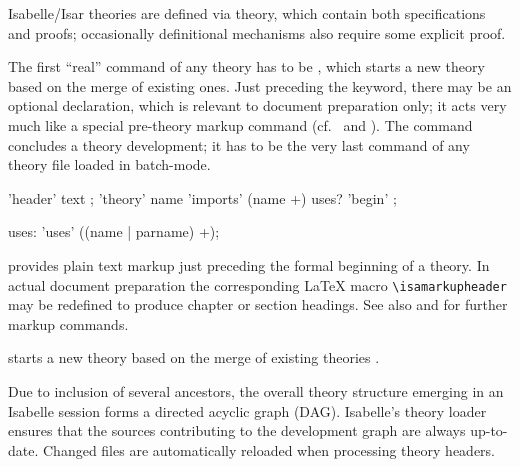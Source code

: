 \begin{isabellebody}
\begin{isamarkuptext}
  Isabelle/Isar theories are defined via theory, which contain both
  specifications and proofs; occasionally definitional mechanisms also
  require some explicit proof.

  The first ``real'' command of any theory has to be \mbox{}, which starts a new theory based on the merge of existing
  ones.  Just preceding the \mbox{} keyword, there may be
  an optional \mbox{} declaration, which is relevant to
  document preparation only; it acts very much like a special
  pre-theory markup command (cf.\  and
  ).  The \mbox{} command concludes a
  theory development; it has to be the very last command of any theory
  file loaded in batch-mode.

  \begin{rail}
    'header' text
    ;
    'theory' name 'imports' (name +) uses? 'begin'
    ;

    uses: 'uses' ((name | parname) +);
  \end{rail}

  \begin{descr}

  \item [\mbox{\isa{\isacommand{header}}}~\isa{{\isachardoublequote}text{\isachardoublequote}}] provides plain text
  markup just preceding the formal beginning of a theory.  In actual
  document preparation the corresponding {\LaTeX} macro \verb|\isamarkupheader| may be redefined to produce chapter or section
  headings.  See also  and
   for further markup commands.
  
  \item [\mbox{\isa{\isacommand{theory}}}~\isa{{\isachardoublequote}A\ {\isasymIMPORTS}\ B\isactrlsub {\isadigit{1}}\ {\isasymdots}\ B\isactrlsub n\ {\isasymBEGIN}{\isachardoublequote}}] starts a new theory  based on the
  merge of existing theories .
  
  Due to inclusion of several ancestors, the overall theory structure
  emerging in an Isabelle session forms a directed acyclic graph
  (DAG).  Isabelle's theory loader ensures that the sources
  contributing to the development graph are always up-to-date.
  Changed files are automatically reloaded when processing theory
  headers.
  

\end{descr}
\end{isamarkuptext}
\end{isabellebody}
